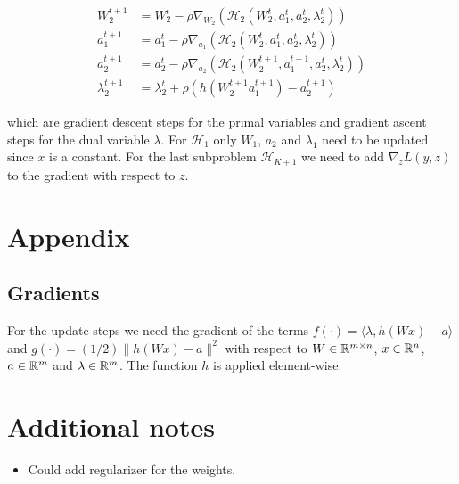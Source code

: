 \documentclass[english,11pt,a4paper]{article}
\newcommand\inner[2]{\langle #1, #2 \rangle}
\begin{document}
\begin{equation}
	\begin{aligned}
		W_2^{t+1} &= W_2^t - \rho \nabla_{W_2}(\mathcal{H}_2(W_2^t,a_1^t,a_2^t,\lambda_2^t)) \\
		a_1^{t+1} &= a_1^t - \rho \nabla_{a_1}(\mathcal{H}_2(W_2^t,a_1^t,a_2^t,\lambda_2^t)) \\
		a_2^{t+1} &= a_2^t - \rho \nabla_{a_2}(\mathcal{H}_2(W_2^{t+1},a_1^{t+1},a_2^t,\lambda_2^t)) \\
		\lambda_2^{t+1} &= \lambda_2^{t} + \rho (h(W_2^{t+1}a_1^{t+1})-a_2^{t+1})
	\end{aligned}
\end{equation}

which are gradient descent steps for the primal variables and gradient ascent steps for the dual variable $\lambda$. For $\mathcal{H}_1$ only $W_1$, $a_2$ and $\lambda_1$ need to be updated since $x$ is a constant. For the last subproblem $\mathcal{H}_{K+1}$ we need to add $\nabla_zL(y,z)$ to the gradient with respect to $z$.


\section{Appendix}

\subsection{Gradients}

For the update steps we need the gradient of the terms $f(\cdot) = \inner{\lambda}{h(Wx)-a}$ and $g(\cdot) = (1/2) \| h(Wx) - a \|^2$ with respect to $W \in \mathbb{R}^{m \times n}$, $x \in \mathbb{R}^n$, $a \in \mathbb{R}^m$ and $\lambda \in \mathbb{R}^m$. The function $h$ is applied element-wise.



\section{Additional notes}

\begin{itemize}
	\item Could add regularizer for the weights.
\end{itemize}

{\small
  
  
}
\end{document}
